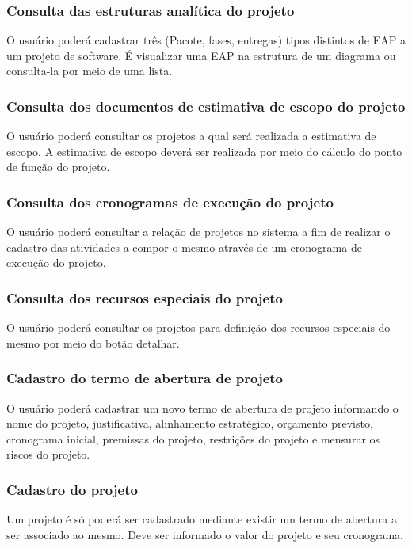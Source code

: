 \documentclass{acm_proc_article-sp}
\begin{document}
\subsubsection{Consulta das estruturas analítica do projeto}
O usuário poderá cadastrar três (Pacote, fases, entregas) tipos distintos de EAP a um projeto de software. É visualizar uma EAP na estrutura de um diagrama ou consulta-la por meio de uma lista. 

\subsubsection{Consulta dos documentos de estimativa de escopo do projeto}
O usuário poderá consultar os projetos a qual será realizada a estimativa de escopo. A estimativa de escopo deverá ser realizada por meio do cálculo do ponto de função do projeto.

\subsubsection{Consulta dos cronogramas de execução do projeto}
O usuário poderá consultar a relação de projetos no sistema a fim de realizar o cadastro das atividades a compor o mesmo através de um cronograma de execução do projeto.

\subsubsection{Consulta dos recursos especiais do projeto}
O usuário poderá consultar os projetos para definição dos recursos especiais do mesmo por meio do botão detalhar.

\subsubsection{Cadastro do termo de abertura de projeto}
O usuário poderá cadastrar um novo termo de abertura de projeto informando o nome do projeto, justificativa, alinhamento estratégico, orçamento previsto, cronograma inicial, premissas do projeto, restrições do projeto e mensurar os riscos do projeto. 

\subsubsection{Cadastro do projeto}
Um projeto é só poderá ser cadastrado mediante existir um termo de abertura a ser associado ao mesmo. Deve ser informado o valor do projeto e seu cronograma.
\end{document}
